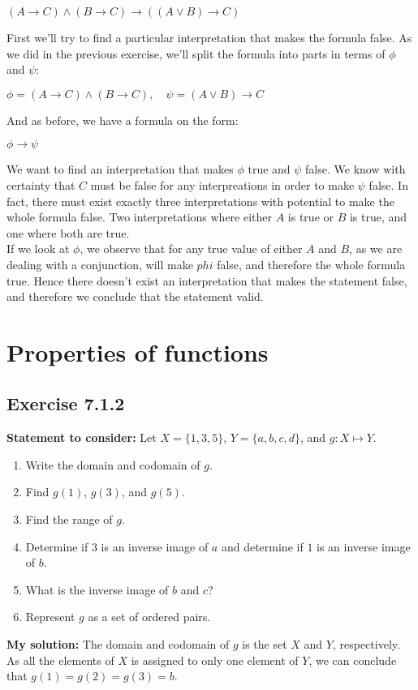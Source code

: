 \documentclass{report}
\newcommand{\cent}[1]{\begin{center}#1\end{center}}
\newcommand{\assignmentDescription}{\textbf{Statement to consider: }}
\newcommand{\solution}{\textbf{My solution: }}
\newcommand{\Section}[1]{\section{#1}}
\newcommand{\Exercise}[1]{\subsection{Exercise #1}}
\newcommand{\defaultEnumerateLabel}{\textbf{\alph*.}}
\begin{document}
\begin{enumerate}
 		\cent{$(A \to C) \wedge (B \to C) \to ((A \vee B) \to C)$}
 		
 		First we'll try to find a particular interpretation that makes the formula false. As we did in the previous exercise, we'll split the formula into parts in terms of $\phi$ and $\psi$:
 		
 		\cent{$\phi = (A \to C) \wedge (B \to C), \quad \psi = (A \vee B) \to C $}
 		
 		And as before, we have a formula on the form:
 		
 		\cent{$\phi \to \psi$}
 		
 		We want to find an interpretation that makes $\phi$ true and $\psi$ false. We know with certainty that $C$ must be false for any interpreations in order to make $\psi$ false. In fact, there must exist exactly three interpretations with potential to make the whole formula false. Two interpretations where either $A$ is true or $B$ is true, and one where both are true.\\
 		
 		If we look at $\phi$, we observe that for any true value of either $A$ and $B$, as we are dealing with a conjunction, will make $phi$ false, and therefore the whole formula true. Hence there doesn't exist an interpretation that makes the statement false, and therefore we conclude that the statement valid.
 	\end{enumerate}
 \Section{Properties of functions}
 	\Exercise{7.1.2}
 	
 	\assignmentDescription 
 	Let $X = \{1,3,5\}$, $Y = \{a,b,c,d\}$, and $g : X \mapsto Y$.
 	
 	\begin{enumerate}[label=\defaultEnumerateLabel]
 		\item Write the domain and codomain of $g$.
 		\item Find $g(1)$, $g(3)$, and $g(5)$.
 		\item Find the range of $g$.
 		\item Determine if 3 is an inverse image of $a$ and determine if $1$ is an inverse image of $b$.
 		\item What is the inverse image of $b$ and $c$?
 		\item Represent $g$ as a set of ordered pairs.
 	\end{enumerate}
 
 	\solution
 	The domain and codomain of $g$ is the set $X$ and $Y$, respectively.\\
 	
 	As all the elements of $X$ is assigned to only one element of $Y$, we can conclude that $g(1) = g(2) = g(3) = b$.\\
 	
\end{document}
